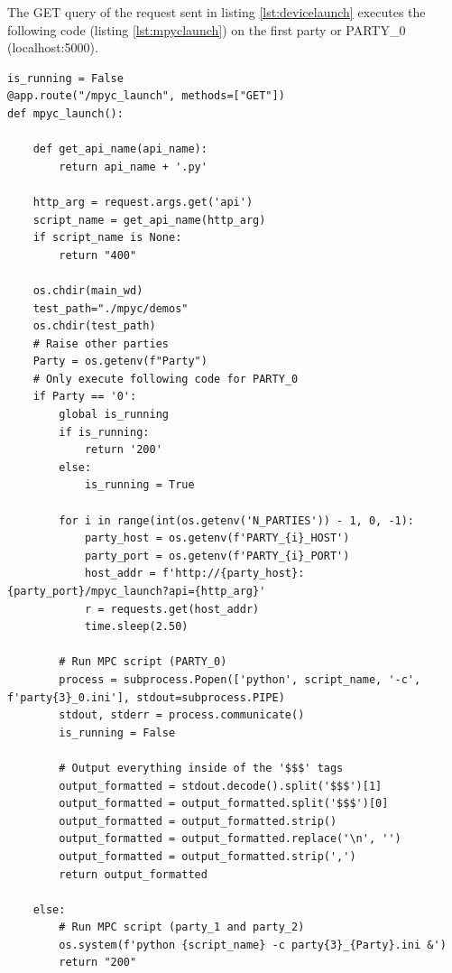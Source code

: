 The GET query of the request sent in listing \ref{lst:devicelaunch} executes the following code (listing \ref{lst:mpyclaunch}) on the first party or PARTY\_0 (localhost:5000).

\begin{lstlisting}[caption={Launching MPC and returning formatted output}, label={lst:mpyclaunch}, frame=single, breaklines=true]
is_running = False
@app.route("/mpyc_launch", methods=["GET"])
def mpyc_launch():

    def get_api_name(api_name):
        return api_name + '.py'

    http_arg = request.args.get('api')
    script_name = get_api_name(http_arg)
    if script_name is None:
        return "400"

    os.chdir(main_wd)
    test_path="./mpyc/demos"
    os.chdir(test_path)
    # Raise other parties
    Party = os.getenv(f"Party")
    # Only execute following code for PARTY_0
    if Party == '0':
        global is_running
        if is_running:
            return '200'
        else:
            is_running = True

        for i in range(int(os.getenv('N_PARTIES')) - 1, 0, -1):
            party_host = os.getenv(f'PARTY_{i}_HOST')
            party_port = os.getenv(f'PARTY_{i}_PORT')
            host_addr = f'http://{party_host}:{party_port}/mpyc_launch?api={http_arg}'
            r = requests.get(host_addr)
            time.sleep(2.50)

        # Run MPC script (PARTY_0)
        process = subprocess.Popen(['python', script_name, '-c', f'party{3}_0.ini'], stdout=subprocess.PIPE)
        stdout, stderr = process.communicate()
        is_running = False

        # Output everything inside of the '$$$' tags
        output_formatted = stdout.decode().split('$$$')[1]
        output_formatted = output_formatted.split('$$$')[0]
        output_formatted = output_formatted.strip()
        output_formatted = output_formatted.replace('\n', '')
        output_formatted = output_formatted.strip(',')
        return output_formatted

    else:
        # Run MPC script (party_1 and party_2)
        os.system(f'python {script_name} -c party{3}_{Party}.ini &')
        return "200"
\end{lstlisting}

